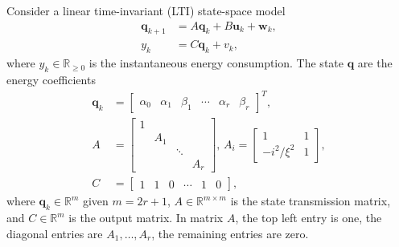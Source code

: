 \documentclass[letterpaper,10pt,conference]{ieeeconf}
\theoremstyle{definition}
\begin{document}
Consider a linear time-invariant (LTI) state-space model
\begin{equation}\label{eq:state-perf}\begin{split}
  \mathbf{q}_{k+1}&=A\mathbf{q}_{k}+B\mathbf{u}_{k}+\mathbf{w}_k,\\
  y_k&=C\mathbf{q}_k+v_k,
\end{split}\end{equation}
where $y_k\in\mathbb{R}_{\geq 0}$ is the instantaneous energy consumption. The state $\mathbf{q}$ are the energy coefficients
\begin{equation}\label{eq:state-details}\begin{split}
  \mathbf{q}_k&=\left[\begin{array}{cccccc}
    \alpha_0 & \alpha_1 & \beta_1 & \cdots & \alpha_r & \beta_r
  \end{array}\right]^T,\\
  A&=\left[\begin{array}{cccc}
    1&    &       &  \\
     & A_1&       &  \\
     &    & \ddots&  \\
     &    &       & A_r 
  \end{array}\right],\,A_i=\begin{bmatrix}1 & 1 \\ -i^2/\xi^2 & 1\end{bmatrix},\\
  C&=\left[\begin{array}{cccccc}
    1 & 1 & 0 & \cdots & 1 & 0
  \end{array}\right],
\end{split}\end{equation}
where $\mathbf{q}_k\in\mathbb{R}^m$ given $m=2r+1$, $A\in\mathbb{R}^{m\times m}$ is the state transmission matrix, and $C\in\mathbb{R}^m$ is the output matrix. In matrix $A$, the top left entry is one, the diagonal entries are $A_1,\dots,A_r$, the remaining entries are zero.
\end{document}
